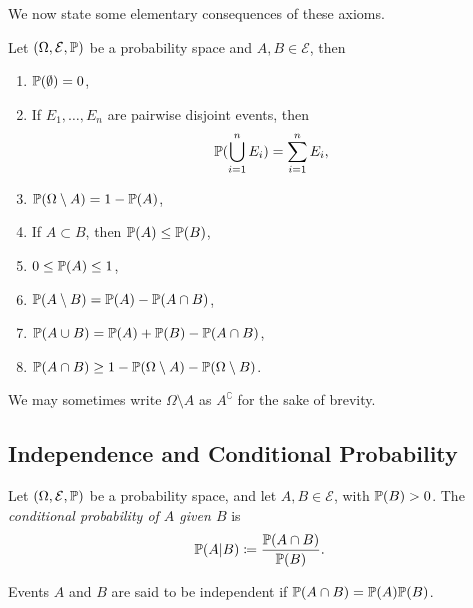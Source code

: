 We now state some elementary consequences of these axioms.
\begin{theorem}
Let $(\Omega, \mathcal{E}, \mathbb{P})$ be a probability space and $A,B \in \mathcal{E}$, then
\begin{enumerate}
    \item $\mathbb{P}(\emptyset) = 0$,
    \item If $E_1, \ldots, E_n$ are pairwise disjoint events, then 
    \begin{equation*}
        \mathbb{P}(\bigcup_{i=1}^n E_i) = \sum_{i=1}^n E_i,
    \end{equation*}
    \item $\mathbb{P}(\Omega \setminus A) = 1 - \mathbb{P}(A)$,
    \item If $A \subset B$, then $\mathbb{P}(A) \leq \mathbb{P}(B)$,
    \item $0 \leq \mathbb{P}(A) \leq 1$,
    \item $\mathbb{P}(A \setminus B) = \mathbb{P}(A) - \mathbb{P}(A \cap B)$,
    \item $\mathbb{P}(A \cup B) = \mathbb{P}(A) + \mathbb{P}(B) - \mathbb{P}(A \cap B)$,
    \item $\mathbb{P}(A \cap B) \geq 1 - \mathbb{P}(\Omega \setminus A ) - \mathbb{P}(\Omega \setminus B)$.
\end{enumerate} 
\end{theorem}
We may sometimes write $\Omega \setminus A$ as $A^\complement$ for the sake of brevity. 

\subsection{Independence and Conditional Probability}

\begin{definition}
    Let $(\Omega, \mathcal{E}, \mathbb{P})$ be a probability space, and let $A,B \in \mathcal{E}$, with $\mathbb{P}(B) > 0$. The \emph{conditional probability of $A$ given $B$} is
    \begin{equation*}
        \mathbb{P}(A | B) \coloneqq \frac{\mathbb{P}(A \cap B)}{\mathbb{P}(B)}.
    \end{equation*}
\end{definition}

\begin{definition}
    Events $A$ and $B$ are said to be independent if $\mathbb{P}(A \cap B) = \mathbb{P}(A) \mathbb{P}(B)$.
\end{definition}

